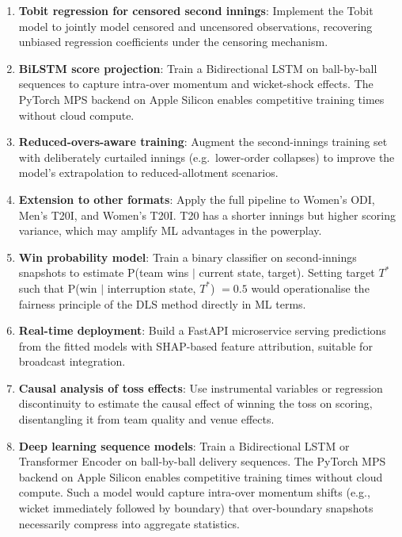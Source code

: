 \documentclass[12pt,a4paper,oneside]{report}
\begin{document}
\begin{enumerate}
    \item \textbf{Tobit regression for censored second innings}: Implement the Tobit model to jointly model censored and uncensored observations, recovering unbiased regression coefficients under the censoring mechanism.

    \item \textbf{BiLSTM score projection}: Train a Bidirectional LSTM on ball-by-ball sequences to capture intra-over momentum and wicket-shock effects.  The PyTorch MPS backend on Apple Silicon enables competitive training times without cloud compute.

    \item \textbf{Reduced-overs-aware training}: Augment the second-innings training set with deliberately curtailed innings (e.g.\ lower-order collapses) to improve the model's extrapolation to reduced-allotment scenarios.

    \item \textbf{Extension to other formats}: Apply the full pipeline to Women's ODI, Men's T20I, and Women's T20I.  T20 has a shorter innings but higher scoring variance, which may amplify ML advantages in the powerplay.

    \item \textbf{Win probability model}: Train a binary classifier on second-innings snapshots to estimate P(team wins $|$ current state, target).  Setting target $T^*$ such that P(win $|$ interruption state, $T^*$) $= 0.5$ would operationalise the fairness principle of the DLS method directly in ML terms.

    \item \textbf{Real-time deployment}: Build a FastAPI microservice serving predictions from the fitted models with SHAP-based feature attribution, suitable for broadcast integration.

    \item \textbf{Causal analysis of toss effects}: Use instrumental variables or regression discontinuity to estimate the causal effect of winning the toss on scoring, disentangling it from team quality and venue effects.

    \item \textbf{Deep learning sequence models}: Train a Bidirectional LSTM or Transformer Encoder on ball-by-ball delivery sequences.  The PyTorch MPS backend on Apple Silicon enables competitive training times without cloud compute.  Such a model would capture intra-over momentum shifts (e.g., wicket immediately followed by boundary) that over-boundary snapshots necessarily compress into aggregate statistics.


\end{enumerate}
\end{document}
